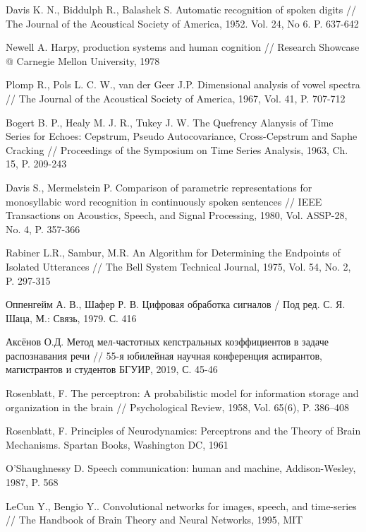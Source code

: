 \begin{thebibliography}{1}
Davis K. N., Biddulph R., Balashek S. Automatic recognition of spoken digits // The Journal of the Acoustical Society of America, 1952. Vol. 24, No 6. P. 637-642 

Newell A. Harpy, production systems and human cognition // Research Showcase @ Carnegie Mellon University, 1978

Plomp R., Pols L. C. W., van der Geer J.P. Dimensional analysis of vowel spectra // The Journal of the Acoustical Society of America, 1967, Vol. 41, P. 707-712 

Bogert B. P., Healy M. J. R., Tukey J. W. The Quefrency Alanysis of Time Series for Echoes: Cepstrum, Pseudo Autocovariance, Cross-Cepstrum and Saphe Cracking // Proceedings of the Symposium on Time Series Analysis, 1963, Ch. 15, P. 209-243

Davis S., Mermelstein P. Comparison of parametric representations for monosyllabic word recognition in continuously spoken sentences // IEEE Transactions on Acoustics, Speech, and Signal Processing, 1980, Vol. ASSP-28, No. 4, P. 357-366

Rabiner L.R., Sambur, M.R. An Algorithm for Determining the Endpoints of Isolated Utterances // The Bell System Technical Journal, 1975, Vol. 54, No. 2, P. 297-315

Оппенгейм А. В., Шафер Р. В. Цифровая обработка сигналов / Под ред. С. Я. Шаца, М.: Связь, 1979. С. 416

Аксёнов О.Д. Метод мел-частотных кепстральных коэффициентов в задаче распознавания речи // 55-я юбилейная научная конференция аспирантов, магистрантов и студентов БГУИР, 2019, С. 45-46

Rosenblatt, F. The perceptron: A probabilistic model for information storage and organization in the brain // Psychological Review, 1958, Vol. 65(6), P. 386–408

Rosenblatt, F. Principles of Neurodynamics: Perceptrons and the Theory of Brain Mechanisms. Spartan Books, Washington DC, 1961

O'Shaughnessy D. Speech communication: human and machine, Addison-Wesley, 1987, P. 568

LeCun Y., Bengio Y.. Convolutional networks for images, speech, and time-series // The Handbook of Brain Theory and Neural Networks, 1995, MIT 
\end{thebibliography}